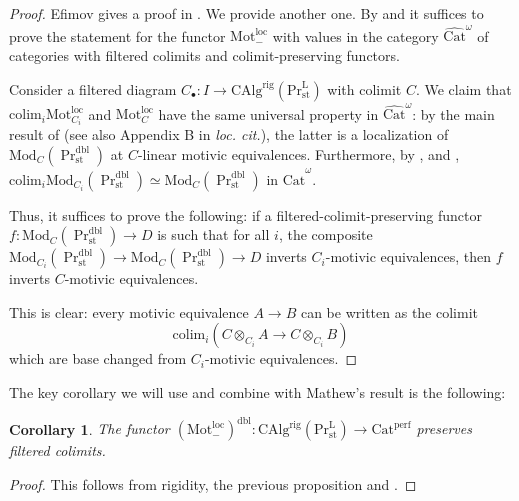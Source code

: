 \documentclass{article}
\newtheorem{cor}[cor]{Corollary}
\theoremstyle{definition}
\newcommand{\cat}{\mathrm}
\newcommand{\Cat}{\cat{Cat}}
\newcommand{\Catperf}{\mathrm{Cat}^{\mathrm{perf}}}
\newcommand{\PrL}{\mathrm{Pr}^\mathrm{L} }
\newcommand{\CAlg}{\mathrm{CAlg}}
\newcommand{\Mod}{\cat{Mod}}
\newcommand{\Mot}{\cat{Mot}^{\mathrm{loc}}}
\newcommand{\colim}{\mathrm{colim}}
\newcommand{\st}{\mathrm{st}}
\newcommand{\dbl}{\mathrm{dbl}}
\begin{document}
\begin{proof}
    Efimov gives a proof in \cite[Proposition 5.3]{rigidity}. We provide another one.  By \cite[Proposition 3.2.9]{stefanich} and \cite[Proposition 1.62]{Dbl} it suffices to prove the statement for the functor $\Mot_{-}$ with values in the category $\widehat{\Cat}^\omega$ of categories with filtered colimits and colimit-preserving functors. 

Consider a filtered diagram $C_\bullet: I\to \CAlg^{\mathrm{rig}}(\PrL_\st)$ with colimit $C$. We claim that $\colim_i \Mot_{C_i}$ and $\Mot_{C}$ have the same universal property in $\widehat{\Cat}^\omega$: by the main result of \cite{RSW} (see also Appendix B in \textit{loc. cit.}), the latter is a localization of $\Mod_{C}(\Pr^\dbl_\st)$ at $C$-linear motivic equivalences. Furthermore, by \cite[Proposition 3.2.9]{stefanich}, \cite[Proposition 1.62]{Dbl} and \cite[Corollary 4.8.5.13]{HA}, $\colim_i \Mod_{C_i}(\Pr^\dbl_\st)\simeq \Mod_{C}(\Pr^\dbl_\st)$ in $\widehat{\Cat}^\omega$.

Thus, it suffices to prove the following: if a filtered-colimit-preserving functor $f:\Mod_{C}(\Pr^\dbl_\st)\to D$ is such that for all $i$, the composite $ \Mod_{C_i}(\Pr^\dbl_\st)\to \Mod_{C}(\Pr^\dbl_\st)\to D$ inverts $C_i$-motivic equivalences, then $f$ inverts $C$-motivic equivalences. 

    This is clear: every motivic equivalence $A\to B$ can be written as the colimit $$\colim_i (C\otimes_{C_i}A\to C\otimes_{C_i}B)$$ which are base changed from $C_i$-motivic equivalences.
\end{proof}

The key corollary we will use and combine with Mathew's result is the following: 
\begin{cor}\label{cor:lift}
The functor $(\Mot_{-})^\dbl:\CAlg^{\mathrm{rig}}(\PrL_\st)\to \Catperf$ preserves filtered colimits. 
\end{cor}
\begin{proof}
This follows from rigidity, the previous proposition and \cite[Proposition 2.50]{Dbl}.
\end{proof}
\end{document}
